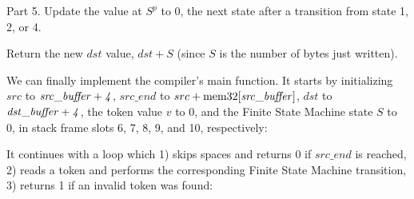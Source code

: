 \begin{Paragraph}
\begin{paracol}{2}

Part 5. Update the value at $S^p$ to 0, the next state after a transition from
state 1, 2, or 4.


Return the new $dst$ value, $dst+S$ (since $S$ is the number of bytes just
written).

\end{paracol}
\end{Paragraph}

We can finally implement the compiler's main function. It starts by
initializing $src$ to $\it{src\_buffer}+4$, $src\_end$ to
$src+\mathrm{mem32}[\it{src\_buffer}]$, $dst$ to $\it{dst\_buffer}+4$,
the token value $v$ to 0, and the Finite State Machine state $S$ to 0, in stack
frame slots 6, 7, 8, 9, and 10, respectively:

\bigskip {}
\vspace{-0.9\baselineskip}
\begin{TwoColumns}
\end{TwoColumns}

It continues with a loop which 1) skips spaces and returns 0 if $src\_end$ is
reached, 2) reads a token and performs the corresponding Finite State Machine
transition, 3) returns 1 if an invalid token was found:

